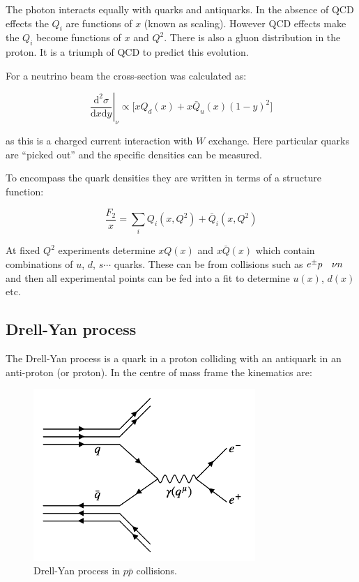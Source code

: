 The photon interacts equally with quarks and antiquarks.  In the absence of QCD effects the $Q_i$ are functions of $x$ (known as scaling).  However QCD effects make the $Q_i$ become functions of $x$ and $Q^2$.  There is also a gluon distribution in the proton.  It is a triumph of QCD to predict this evolution.

For a neutrino beam the cross-section was calculated as:

\[
  \left.\frac{\mathrm{d}^2\sigma}{\mathrm{d}x\mathrm{d}y}\right|_{\nu} \propto \Big[xQ_d(x) + x\bar{Q}_u(x)\left(1 - y\right)^2\Big]
\]

as this is a charged current interaction with $W$ exchange.  Here particular quarks are ``picked out'' and the specific densities can be measured.

To encompass the quark densities they are written in terms of a structure function:

\[
  \frac{F_2}{x} = \sum_i Q_i(x,Q^2) + \bar{Q}_i(x,Q^2)
\]

At fixed $Q^2$ experiments determine $xQ(x)$ and $x\bar{Q}(x)$ which contain combinations of $u$, $d$, $s \cdots$ quarks.  These can be from collisions such as $e^{\pm}p \quad \nu n$ and then all experimental points can be fed into a fit to determine $u(x)$, $d(x)$ etc.

\subsection{Drell-Yan process}

The Drell-Yan process is a quark in a proton colliding with an antiquark in an anti-proton (or proton).  In the centre of mass frame the kinematics are:

\begin{figure}[!htb]
  \begin{center}
    \includegraphics[width=0.75\textwidth]{images/web_feynman/image_64.png}
    \caption[Drell-Yan process]{Drell-Yan process in $p\bar{p}$ collisions.}
    \label{fig:ch14_DrellYan}
  \end{center}
\end{figure}

